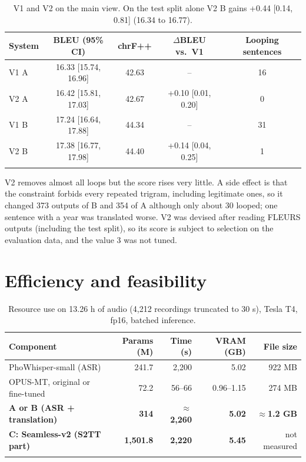 \documentclass[pdflatex,sn-mathphys-num]{sn-jnl}
\newcommand{\ci}[2]{[#1, #2]}   %
\begin{document}
\begin{table}[t]
\caption{V1 and V2 on the main view. On the test split alone V2 B gains +0.44 \ci{0.14}{0.81} (16.34 to 16.77).}\label{tab:v2}
\begin{tabular}{@{}lcccc@{}}
\toprule
System & BLEU (95\% CI) & chrF++ & $\Delta$BLEU vs.\ V1 & Looping sentences\\
\midrule
V1 A & 16.33 \ci{15.74}{16.96} & 42.63 & -- & 16\\
V2 A & 16.42 \ci{15.81}{17.03} & 42.67 & +0.10 \ci{0.01}{0.20} & 0\\
V1 B & 17.24 \ci{16.64}{17.88} & 44.34 & -- & 31\\
V2 B & 17.38 \ci{16.77}{17.98} & 44.40 & +0.14 \ci{0.04}{0.25} & 1\\
\botrule
\end{tabular}
\end{table}

V2 removes almost all loops but the score rises very little. A side effect is that the constraint forbids every repeated trigram, including legitimate ones, so it changed 373 outputs of B and 354 of A although only about 30 looped; one sentence with a year was translated worse. V2 was devised after reading FLEURS outputs (including the test split), so its score is subject to selection on the evaluation data, and the value 3 was not tuned.

\section{Efficiency and feasibility}\label{sec:eff}

\begin{table}[t]
\caption{Resource use on 13.26 h of audio (4,212 recordings truncated to 30 s), Tesla T4, fp16, batched inference.}\label{tab:eff}
\begin{tabular}{@{}lrrrr@{}}
\toprule
Component & Params (M) & Time (s) & VRAM (GB) & File size\\
\midrule
PhoWhisper-small (ASR) & 241.7 & 2,200 & 5.02 & 922 MB\\
OPUS-MT, original or fine-tuned & 72.2 & 56--66 & 0.96--1.15 & 274 MB\\
\textbf{A or B (ASR + translation)} & \textbf{314} & \textbf{$\approx$2,260} & \textbf{5.02} & \textbf{$\approx$1.2 GB}\\
\textbf{C: Seamless-v2 (S2TT part)} & \textbf{1,501.8} & \textbf{2,220} & \textbf{5.45} & not measured\\
\botrule
\end{tabular}
\end{table}
\end{document}
